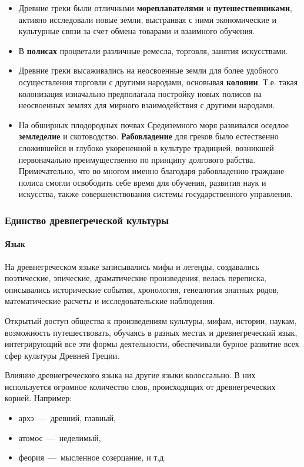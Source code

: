 \begin{itemize}
    \item Древние греки были отличными \textbf{мореплавателями} и \textbf{путешественниками}, активно исследовали новые земли, выстраивая с ними экономические и культурные связи за счет обмена товарами и взаимного обучения.
    \item В \textbf{полисах} процветали различные ремесла, торговля, занятия искусствами.
    \item Древние греки высаживались на неосвоенные земли для более удобного осуществления торговли с другими народами, основывая \textbf{колонии}. Т.е. такая колонизация изначально предполагала постройку новых полисов на неосвоенных землях для мирного взаимодействия с другими народами.
    \item На обширных плодородных почвах Средиземного моря развивался оседлое \textbf{земледелие} и скотоводство. \textbf{Рабовладение} для греков было естественно сложившейся и глубоко укорененной в культуре традицией, возникшей первоначально преимущественно по принципу долгового рабства. Примечательно, что во многом именно благодаря рабовладению граждане полиса смогли освободить себе время для обучения, развития наук и искусства, также совершенствования системы государственного управления.
\end{itemize}

\subsubsection{Единство древнегреческой культуры}

\paragraph{Язык}
На древнегреческом языке записывались мифы и легенды, создавались поэтические, эпические, драматические произведения, велась переписка, описывались исторические события, хронология, генеалогия знатных родов, математические расчеты и исследовательские наблюдения.

Открытый доступ общества к произведениям культуры, мифам, истории, наукам, возможность путешествовать, обучаясь в разных местах и древнегреческий язык, интегрирующий все эти формы деятельности, обеспечивали бурное развитие всех сфер культуры Древней Греции. 

Влияние древнегреческого языка на другие языки колоссально. В них используется огромное количество слов, происходящих от древнегреческих корней.
Например:
\begin{itemize}
    \item архэ~---~древний, главный,
    \item атомос~---~неделимый,
    \item феория~---~мысленное созерцание, и т.д.
\end{itemize}

